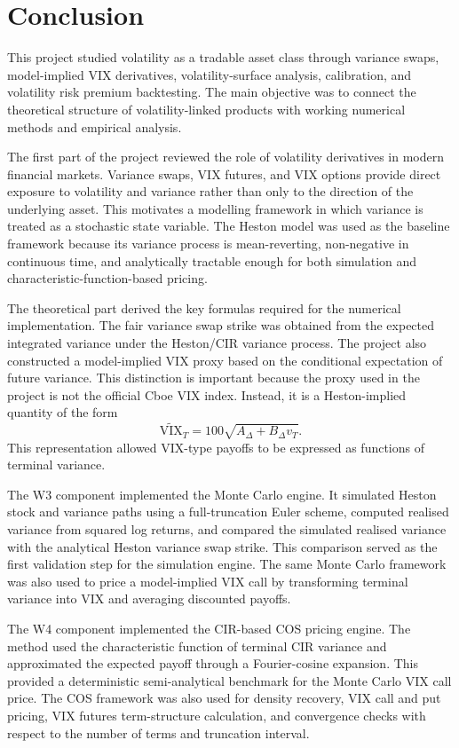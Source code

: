 \section{Conclusion}
\label{sec:conclusion}

This project studied volatility as a tradable asset class through variance swaps, model-implied VIX derivatives, volatility-surface analysis, calibration, and volatility risk premium backtesting. The main objective was to connect the theoretical structure of volatility-linked products with working numerical methods and empirical analysis.

The first part of the project reviewed the role of volatility derivatives in modern financial markets. Variance swaps, VIX futures, and VIX options provide direct exposure to volatility and variance rather than only to the direction of the underlying asset. This motivates a modelling framework in which variance is treated as a stochastic state variable. The Heston model was used as the baseline framework because its variance process is mean-reverting, non-negative in continuous time, and analytically tractable enough for both simulation and characteristic-function-based pricing.

The theoretical part derived the key formulas required for the numerical implementation. The fair variance swap strike was obtained from the expected integrated variance under the Heston/CIR variance process. The project also constructed a model-implied VIX proxy based on the conditional expectation of future variance. This distinction is important because the proxy used in the project is not the official Cboe VIX index. Instead, it is a Heston-implied quantity of the form
\[
\widetilde{\mathrm{VIX}}_T
=
100\sqrt{A_\Delta+B_\Delta v_T}.
\]
This representation allowed VIX-type payoffs to be expressed as functions of terminal variance.

The W3 component implemented the Monte Carlo engine. It simulated Heston stock and variance paths using a full-truncation Euler scheme, computed realised variance from squared log returns, and compared the simulated realised variance with the analytical Heston variance swap strike. This comparison served as the first validation step for the simulation engine. The same Monte Carlo framework was also used to price a model-implied VIX call by transforming terminal variance into VIX and averaging discounted payoffs.

The W4 component implemented the CIR-based COS pricing engine. The method used the characteristic function of terminal CIR variance and approximated the expected payoff through a Fourier-cosine expansion. This provided a deterministic semi-analytical benchmark for the Monte Carlo VIX call price. The COS framework was also used for density recovery, VIX call and put pricing, VIX futures term-structure calculation, and convergence checks with respect to the number of terms and truncation interval.

